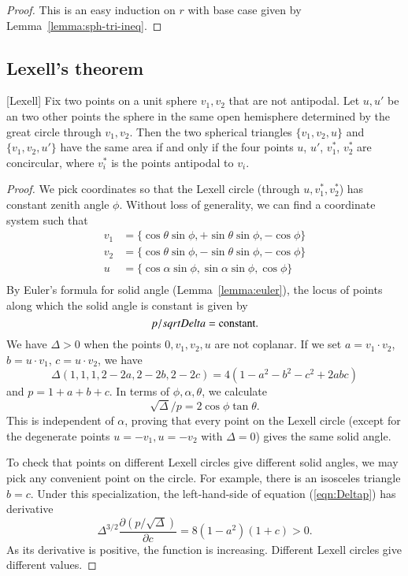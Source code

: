 \begin{proof} This is an easy induction on $r$ with base
case given by Lemma~\ref{lemma:sph-tri-ineq}.
\end{proof}

\subsection{Lexell's theorem}

\begin{lemma}[Lexell]
Fix two points on a unit sphere $v_1,v_2$ that
are not antipodal.
Let $u,u'$ be an two other points the sphere in the same open hemisphere determined by the great circle through $v_1,v_2$.  Then the two spherical triangles $\{v_1,v_2,u\}$ and $\{v_1,v_2,u'\}$ have the same area if and only if
the four points $u$, $u'$, $v^*_1$, $v^*_2$ are concircular, where $v^*_i$ is the points antipodal to $v_i$.
\end{lemma}

\begin{proof}  We pick coordinates so that the Lexell circle (through $u,v^*_1,v^*_2$) has constant zenith angle $\phi$.  Without loss of generality, we can find a coordinate system such that 
$$
\begin{array}{lll}
v_1 &= \{\cos\theta\sin\phi,+\sin\theta\sin\phi,-\cos\phi\}\\
v_2 &= \{\cos\theta\sin\phi,-\sin\theta\sin\phi,-\cos\phi\}\\
u &= \{\cos\alpha\sin\phi,\sin\alpha\sin\phi,\cos\phi\}\\
\end{array}
$$
By Euler's formula for solid angle (Lemma~\ref{lemma:euler}), the locus of points along which the solid angle is constant is given by
\begin{equation}\label{eqn:Deltap}
p/\sqrt{\Delta} = \hbox{constant}.
\end{equation}
We have $\Delta>0$ when the points $0,v_1,v_2,u$ are not coplanar.
If we set $a = v_1\cdot v_2$, $b = u\cdot v_1$, $c= u\cdot v_2$, we have
$$
\Delta(1,1,1,2-2a,2-2b,2-2c) = 4 (1-a^2-b^2-c^2+2 a b c)
$$ 
and
$p = 1+a+b+c$.    In terms of $\phi,\alpha,\theta$, we calculate
$$
\sqrt{\Delta}/p = 2\cos\phi \tan\theta.
$$
This is independent of $\alpha$, proving that every point on the Lexell circle (except for the degenerate points $u= -v_1,u=-v_2$ with $\Delta=0$) gives the same solid angle.

To check that points on different Lexell circles give different solid angles, we may pick any convenient point on the circle.  For example, there is an isosceles triangle $b=c$.  Under this specialization, the left-hand-side of equation (\ref{eqn:Deltap}) has derivative
$$
\Delta^{3/2} \frac{\partial (p/\sqrt{\Delta})}{\partial c} = 8 (1-a^2)(1+c) > 0.
$$
As its derivative is positive, the function is increasing.  Different Lexell circles give different values.
\end{proof}

